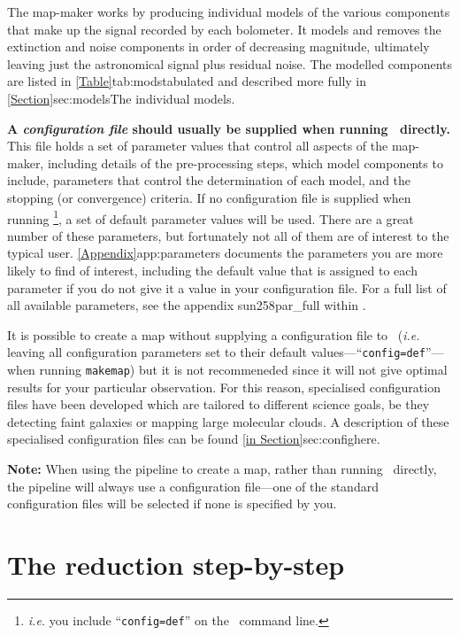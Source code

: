 The map-maker works by producing individual models of the various
components that make up the signal recorded by each bolometer.  It
models and removes the extinction and noise components in order of
decreasing magnitude, ultimately leaving just the astronomical signal
plus residual noise.  The modelled components are listed in
\cref{Table}{tab:mods}{tabulated} and described more fully in
\cref{Section}{sec:models}{The individual models}.

\textbf{A \emph{configuration file} should usually be supplied when
running \makemap\ directly.} This file holds a set of parameter values
that control all aspects of the map-maker, including details of the
pre-processing steps, which model components to include, parameters that
control the determination of each model, and the stopping (or
convergence) criteria. If no configuration file is supplied when running
\makemap\footnote{\emph{i.e.} you include ``\texttt{config=def}'' on the
\makemap\ command line.}, a set of default parameter values will be used.
There are a great number of these parameters, but fortunately not all of
them are of interest to the typical user. \cref{Appendix}{app:parameters}{}
documents the parameters you are more likely to find of interest,
including the default value that is assigned to each parameter if you do
not give it a value in your configuration file.  For a full list of all
available parameters, see the appendix 
{sun258}{par_full} within .

It is possible to create a map without supplying a configuration file to
\makemap\ (\emph{i.e.} leaving all configuration parameters set to their default
values---``\texttt{config=def}''---when running \texttt{makemap}) but it is not
recommeneded since it will not give optimal results
for your particular observation. For this reason, specialised
configuration files have been developed which are tailored to different
science goals, be they detecting faint galaxies or mapping large
molecular clouds. A description of these specialised configuration files
can be found \cref{in Section}{sec:config}{here}.

\textbf{Note:} When using the pipeline to create a map, rather than running
\makemap\ directly, the pipeline will always use a configuration
file---one of the standard configuration files will be selected if none is
specified by you.

\section{The reduction step-by-step}%
\label{sec:algorithm}

